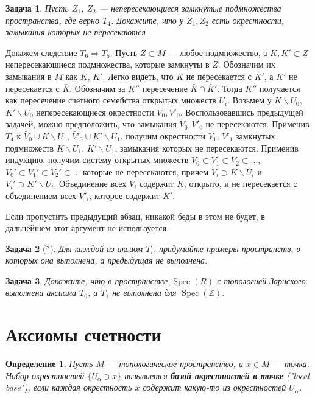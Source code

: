 \documentclass[12pt]{book}
\newcommand{\Spec}{\operatorname{Spec}}
\def\Z{{\mathbb Z}}
\theoremstyle{upshape}
\newtheorem{zadacha}{Задача}[chapter]
\theoremstyle{generic}
\newtheorem{opredelenie}[teorema]{Определение}
\newtheorem{remark}[teorema]{Замечание}
\def\замечание{\begin{remark}}
\def\еза{\end{remark}}
\theoremstyle{upshapenonumber}
\newcommand{\следствие}{%
     \refstepcounter{teorema}
     {\noindent\bf Следствие \thechapter.\arabic{teorema}:\ }}
\newcommand{\пример}{%
     \refstepcounter{teorema}
     {\noindent\bf Пример \thechapter.\arabic{teorema}:\ }}
\newcommand{\лемма}{%
     \refstepcounter{teorema}
     {\noindent\bf Лемма \thechapter.\arabic{teorema}:\ }}
\newcommand{\теорема}{%
     \refstepcounter{teorema}
     {\noindent\bf Теорема \thechapter.\arabic{teorema}:\ }}
\newcommand{\утверждение}{%
     \refstepcounter{teorema}
     {\noindent\bf Утверждение \thechapter.\arabic{teorema}:\ }}
\def\ем{\em}
\def\задача{\begin{zadacha}}
\def\ез{\end{zadacha}}
\def\еу{\end{ukazanie}}
\def\определение{\begin{opredelenie}}
\def\ео{\end{opredelenie}}
\def\енум{\begin{enumerate}}
\def\ее{\end{enumerate}}
\begin{document}
\задача
Пусть $Z_1$, $Z_2$ --- непересекающиеся
замкнутые подмножества пространства, где верно $T_4$.
Докажите, что у $Z_1, Z_2$ есть окрестности, замыкания
которых не пересекаются.
\ез

{\small Докажем следствие $T_6 \Rightarrow T_5$. Пусть $Z\subset
M$ --- любое подмножество, а $K, K'\subset Z$ непересекающиеся
подмножества, которые замкнуты в $Z$. Обозначим их
замыкания в $M$ как $\bar K$, $\bar K'$. Легко видеть,
что $K$ не пересекается с $\bar K'$, а 
$K'$ не пересекается с $\bar K$. Обозначим
за $K''$ пересечение $\bar K\cap \bar K'$.
Тогда $K''$ получается как пересечение
счетного семейства открытых множеств $U_i$.
 Возьмем у $K\backslash U_0$, $K'\backslash U_0$ непересекающиеся
окрестности $V_0, V'_0$. Воспользовавшись  предыдущей
задачей, можно предположить, что замыкания 
$\bar V_0, \bar V'_0$ не пересекаются.
Применив $T_4$ к $\bar V_0\cup K\backslash U_1$,
$\bar V'_0\cup K'\backslash U_1$, получим
окрестности $V_1$, $V'_1$ замкнутых подмножеств
$K\backslash U_1$, $K'\backslash U_1$, замыкания
которых не пересекаются. Применив индукцию,
получим систему открытых множеств
$V_0 \subset V_1\subset V_2 \subset ...$,
$V_0' \subset V_1'\subset V_2' \subset ...$
которые не пересекаются, причем
$V_i\supset K\backslash U_i$ и $V_i'\supset K'\backslash U_i$.
Объединение всех $V_i$ содержит $K$, открыто,
и не пересекается с объединением всех $V'_i$, которое
содержит $K'$.}

\hfill

Если пропустить предыдущий абзац, никакой беды в этом не будет,
в дальнейшем этот аргумент не используется.

\задача[*]
Для каждой из аксиом $T_i$, 
придумайте примеры про\-ст\-ранств, 
в которых она выполнена, а предыдущая
не выполнена.
\ез

\задача 
Докажите, что в пространстве $\Spec(R)$ с топологией
Зариского выполнена аксиома $T_0$, а $T_1$ не выполнена
для $\Spec(\Z)$.
\ез

\section{Аксиомы счетности}


\определение
Пусть $M$ --- топологическое пространство, а $x\in M$ --- точка.
Набор окрестностей $\{U_\alpha\ni x\}$ называется
{\bf базой окрестностей в точке} ("local base"), если каждая
окрестность $x$ содержит какую-то из окрестностей $U_\alpha$.
\ео
\end{document}
